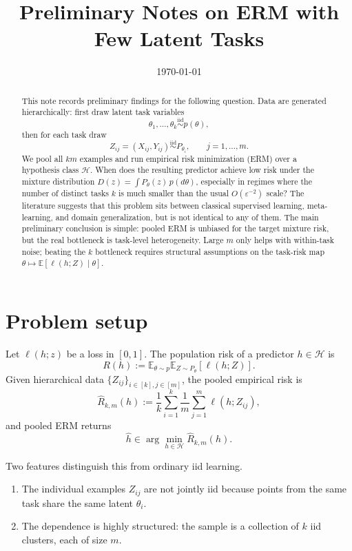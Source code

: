 \documentclass[11pt]{article}
\title{Preliminary Notes on ERM with Few Latent Tasks}
\author{}
\date{\today}
\theoremstyle{definition}
\newcommand{\E}{\mathbb{E}}
\begin{document}
\maketitle

\begin{abstract}
This note records preliminary findings for the following question. Data are generated hierarchically: first draw latent task variables
\[
\theta_1,\dots,\theta_k \overset{\mathrm{iid}}{\sim} p(\theta),
\]
then for each task draw
\[
Z_{ij} = (X_{ij},Y_{ij}) \overset{\mathrm{iid}}{\sim} P_{\theta_i},
\qquad j=1,\dots,m.
\]
We pool all $km$ examples and run empirical risk minimization (ERM) over a hypothesis class $\mathcal{H}$. When does the resulting predictor achieve low risk under the mixture distribution $D(z) = \int P_{\theta}(z)\,p(d\theta)$, especially in regimes where the number of distinct tasks $k$ is much smaller than the usual $O(\varepsilon^{-2})$ scale? The literature suggests that this problem sits between classical supervised learning, meta-learning, and domain generalization, but is not identical to any of them. The main preliminary conclusion is simple: pooled ERM is unbiased for the target mixture risk, but the real bottleneck is task-level heterogeneity. Large $m$ only helps with within-task noise; beating the $k$ bottleneck requires structural assumptions on the task-risk map $\theta \mapsto \E[\ell(h;Z)\mid \theta]$.
\end{abstract}

\section{Problem setup}
Let $\ell(h;z)$ be a loss in $[0,1]$. The population risk of a predictor $h \in \mathcal{H}$ is
\[
R(h) := \E_{\theta \sim p}\E_{Z \sim P_{\theta}}[\ell(h;Z)].
\]
Given hierarchical data $\{Z_{ij}\}_{i \in [k], j \in [m]}$, the pooled empirical risk is
\[
\widehat{R}_{k,m}(h) := \frac{1}{k}\sum_{i=1}^k \frac{1}{m}\sum_{j=1}^m \ell(h;Z_{ij}),
\]
and pooled ERM returns
\[
\widehat{h} \in \arg\min_{h \in \mathcal{H}} \widehat{R}_{k,m}(h).
\]

Two features distinguish this from ordinary iid learning.
\begin{enumerate}[label=(\roman*)]
\item The individual examples $Z_{ij}$ are not jointly iid because points from the same task share the same latent $\theta_i$.
\item The dependence is highly structured: the sample is a collection of $k$ iid clusters, each of size $m$.
\end{enumerate}
\end{document}

